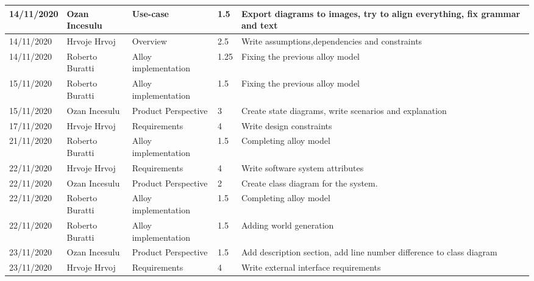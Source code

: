 \begin{table}[H]
    \begin{tabular}{|p{2cm}|p{2.5cm}|p{2cm}|p{1.5cm}|p{8cm}|}
    \hline
        14/11/2020 & Ozan Incesulu   & Use-case             & 1.5              & Export diagrams to images, try to align everything, fix grammar and text \\ \hline
        14/11/2020 & Hrvoje Hrvoj    & Overview             & 2.5                & Write assumptions,dependencies and constraints                                                                                                                                                                  \\ \hline
        14/11/2020 & Roberto Buratti & Alloy implementation & 1.25             & Fixing the previous alloy model \\ \hline
        15/11/2020 & Roberto Buratti & Alloy implementation & 1.5              & Fixing the previous alloy model \\ \hline
        15/11/2020 & Ozan Incesulu   & Product Perspective  & 3                & Create state diagrams, write scenarios and explanation \\ \hline
        17/11/2020 & Hrvoje Hrvoj    & Requirements         & 4                & Write design constraints \\ \hline
        21/11/2020 & Roberto Buratti & Alloy implementation & 1.5              & Completing alloy model \\ \hline
        22/11/2020 & Hrvoje Hrvoj    & Requirements         & 4                & Write software system attributes                                                                                                                                                                  \\ \hline
        22/11/2020 & Ozan Incesulu   & Product Perspective  & 2                & Create class diagram for the system. \\ \hline
        22/11/2020 & Roberto Buratti & Alloy implementation & 1.5              & Completing alloy model \\ \hline
        22/11/2020 & Roberto Buratti & Alloy implementation & 1.5              & Adding world generation \\ \hline
        23/11/2020 & Ozan Incesulu   & Product Perspective  & 1.5              & Add description section, add line number difference to class diagram \\ \hline
        23/11/2020 & Hrvoje Hrvoj    & Requirements         & 4                & Write external interface requirements                                                                                                                                                                  \\ \hline

\end{tabular}
\end{table}

